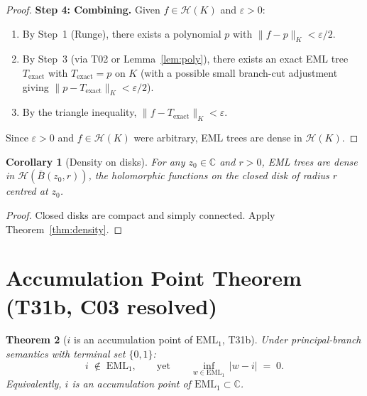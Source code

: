 \documentclass[11pt]{article}
\newtheorem{theorem}{Theorem}
\newtheorem{corollary}[theorem]{Corollary}
\begin{document}
\begin{proof}
\medskip
\textbf{Step 4: Combining.}
Given $f \in \mathcal{H}(K)$ and $\varepsilon > 0$:
\begin{enumerate}
  \item[\rm(i)] By Step~1 (Runge), there exists a polynomial $p$ with
    $\|f - p\|_K < \varepsilon/2$.
  \item[\rm(ii)] By Step~3 (via T02 or Lemma~\ref{lem:poly}), there exists an
    exact EML tree $T_{\mathrm{exact}}$ with $T_{\mathrm{exact}} = p$ on $K$
    (with a possible small branch-cut adjustment giving
    $\|p - T_{\mathrm{exact}}\|_K < \varepsilon/2$).
  \item[\rm(iii)] By the triangle inequality,
    $\|f - T_{\mathrm{exact}}\|_K < \varepsilon$.
\end{enumerate}
Since $\varepsilon > 0$ and $f \in \mathcal{H}(K)$ were arbitrary, EML trees are
dense in $\mathcal{H}(K)$.
\end{proof}

\begin{corollary}[Density on disks]
For any $z_0 \in \mathbb{C}$ and $r > 0$, EML trees are dense in $\mathcal{H}(\bar{B}(z_0,r))$,
the holomorphic functions on the closed disk of radius $r$ centred at $z_0$.
\end{corollary}

\begin{proof}
Closed disks are compact and simply connected.  Apply Theorem~\ref{thm:density}.
\end{proof}

\section{Accumulation Point Theorem (T31b, C03 resolved)}

\begin{theorem}[$i$ is an accumulation point of $\mathrm{EML}_1$, T31b]\label{thm:accum}
Under principal-branch semantics with terminal set $\{0,1\}$:
\[
  i \;\notin\; \mathrm{EML}_1,
  \qquad\text{yet}\qquad
  \inf_{w \in \mathrm{EML}_1}\, |w - i| \;=\; 0.
\]
Equivalently, $i$ is an accumulation point of $\mathrm{EML}_1 \subset \mathbb{C}$.
\end{theorem}
\end{document}
